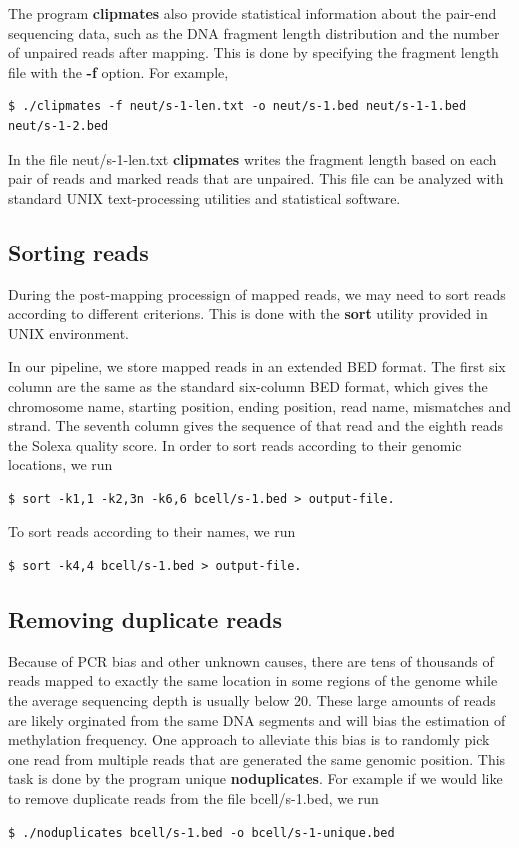 \documentclass{article}
\begin{document}
The program \textbf{clipmates} also provide statistical
information about the pair-end sequencing data, such as the DNA
fragment length distribution and the number of unpaired reads after
mapping. This is done by specifying the fragment length file with the
\textbf{-f} option. For example,
\begin{verbatim}
$ ./clipmates -f neut/s-1-len.txt -o neut/s-1.bed neut/s-1-1.bed neut/s-1-2.bed 
\end{verbatim}
In the file neut/s-1-len.txt \textbf{clipmates} writes the fragment
length based on each pair of reads and marked reads that are
unpaired. This file can be analyzed with standard UNIX text-processing
utilities and statistical software.

\subsection{Sorting reads}
\label{sec:sorting-reads}
During the post-mapping processign of mapped reads, we may need to
sort reads according to different criterions. This is done with the
\textbf{sort} utility provided in UNIX environment. 

In our pipeline, we store mapped reads in an extended BED format. The
first six column are the same as the standard six-column BED format,
which gives the chromosome name, starting position, ending position,
read name, mismatches and strand. The seventh column gives the
sequence of that read and the eighth reads the Solexa quality
score. In order to sort reads according to their genomic locations, we
run
\begin{verbatim}
$ sort -k1,1 -k2,3n -k6,6 bcell/s-1.bed > output-file.
\end{verbatim}
To sort reads according to their names,  we run 
\begin{verbatim}
$ sort -k4,4 bcell/s-1.bed > output-file.
\end{verbatim}


\subsection{Removing duplicate reads}
\label{sec:proc-dupl-reads}
Because of PCR bias and other unknown causes, there are tens of
thousands of reads mapped to exactly the same location in some regions
of the genome while the average sequencing depth is usually below
20. These large amounts of reads are likely orginated from the same
DNA segments and will bias the estimation of methylation
frequency. One approach to alleviate this bias is to randomly pick one
read from multiple reads that are generated the same genomic
position. This task is done by the program unique
\textbf{noduplicates}. For example if we would like to remove
duplicate reads from the file bcell/s-1.bed, we run
\begin{verbatim}
$ ./noduplicates bcell/s-1.bed -o bcell/s-1-unique.bed
\end{verbatim}
\end{document}
